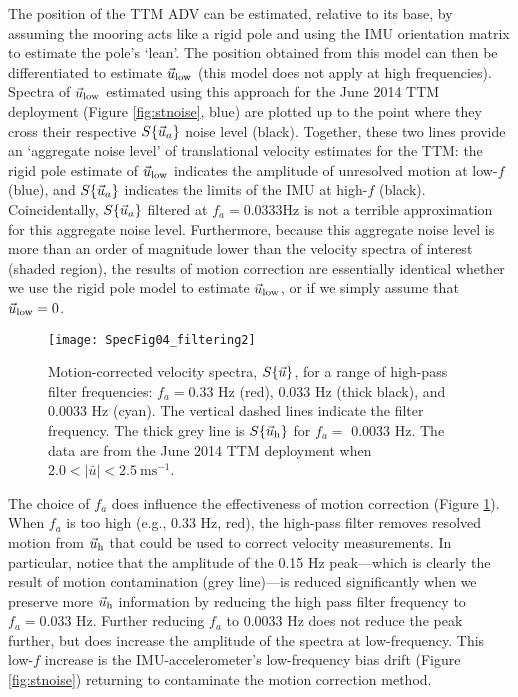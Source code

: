 The position of the TTM ADV can be estimated, relative to its base, by assuming the mooring acts like a rigid pole and using the IMU orientation matrix to estimate the pole's `lean'. The position obtained from this model can then be differentiated to estimate $\vec{u}_\mathrm{low}$ (this model does not apply at high frequencies). Spectra of $\vec{u}_\mathrm{low}$ estimated using this approach for the June 2014 TTM deployment (Figure \ref{fig:stnoise}, blue) are plotted up to the point where they cross their respective $S\{\vec{u}_a\}$ noise level (black).  Together, these two lines provide an `aggregate noise level' of translational velocity estimates for the TTM: the rigid pole estimate of $\vec{u}_\mathrm{low}$ indicates the amplitude of unresolved motion at low-$f$ (blue), and $S\{\vec{u}_a\}$ indicates the limits of the IMU at high-$f$ (black). Coincidentally, $S\{\vec{u}_a\}$ filtered at $f_a = 0.0333$Hz is not a terrible approximation for this aggregate noise level. Furthermore, because this aggregate noise level is more than an order of magnitude lower than the velocity spectra of interest (shaded region), the results of motion correction are essentially identical whether we use the rigid pole model to estimate $\vec{u}_\mathrm{low}$, or if we simply assume that $\vec{u}_\mathrm{low} = 0$. 


\begin{figure}[t]
  \centering
  \texttt{[image: SpecFig04\_filtering2]}
  \caption{Motion-corrected velocity spectra, $S\{\vec{u}\}$, for a range of high-pass filter frequencies: $f_a= 0.33$ Hz (red), 0.033 Hz (thick black), and 0.0033 Hz (cyan). The vertical dashed lines indicate the filter frequency. The thick grey line is $S\{\vec{u}_\mathrm{h}\}$ for $f_a=$ 0.0033 Hz. The data are from the June 2014 TTM deployment when $2.0 < |\bar{u}| < 2.5\ \mathrm{ms^{-1}}$.
}
  \label{fig:filts}
\end{figure}

The choice of $f_a$ does influence the effectiveness of motion correction (Figure \ref{fig:filts}). When $f_a$ is too high (e.g., 0.33  Hz, red), the high-pass filter removes resolved motion from $\vec{u}_\mathrm{h}$ that could be used to correct velocity measurements. In particular, notice that the amplitude of the 0.15 Hz peak---which is clearly the result of motion contamination (grey line)---is reduced significantly when we preserve more $\vec{u}_\mathrm{h}$ information by reducing the high pass filter frequency to $f_a = 0.033$ Hz. Further reducing $f_a$ to $0.0033$ Hz does not reduce the peak further, but does increase the amplitude of the spectra at low-frequency. This low-$f$ increase is the IMU-accelerometer's low-frequency bias drift (Figure \ref{fig:stnoise}) returning to contaminate the motion correction method.

